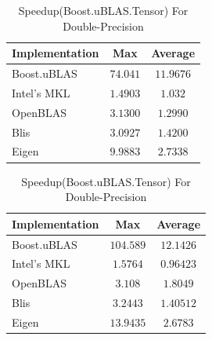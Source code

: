 \begin{table}[ht]
    \centering
    \caption{Speedup(Boost.uBLAS.Tensor) For Single-Precision}
    \begin{tabular}{|l|c|c|}
        \hline
        \textbf{Implementation} & \textbf{Max} & \textbf{Average}\\
        \hline
        Boost.uBLAS         & $74.041$& $11.9676$ \\
        \hline
        Intel's MKL         & $1.4903$& $1.032$ \\
        \hline
        OpenBLAS            & $3.1300$& $1.2990$ \\
        \hline
        Blis                & $3.0927$& $1.4200$ \\
        \hline
        Eigen               & $9.9883$& $2.7338$ \\
        \hline
    \end{tabular}

    \vspace*{1 cm}

    \centering
    \caption{Speedup(Boost.uBLAS.Tensor) For Double-Precision}
    \begin{tabular}{|l|c|c|}
        \hline
        \textbf{Implementation} & \textbf{Max} & \textbf{Average}\\
        \hline
        Boost.uBLAS         & $104.589$& $12.1426$ \\
        \hline
        Intel's MKL         & $1.5764$& $0.96423$ \\
        \hline
        OpenBLAS            & $3.108$& $1.8049$ \\
        \hline
        Blis                & $3.2443$& $1.40512$ \\
        \hline
        Eigen               & $13.9435$& $2.6783$ \\
        \hline
    \end{tabular}
\end{table}